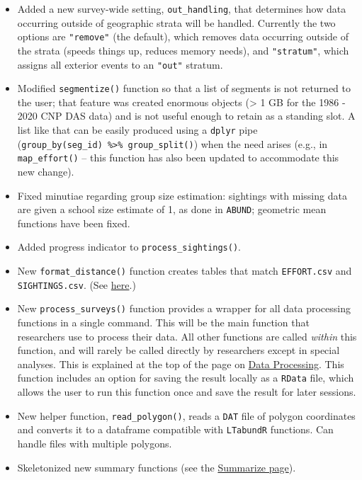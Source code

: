 \documentclass[
]{book}
\begin{document}
\begin{itemize}
\item
  Added a new survey-wide setting, \texttt{out\_handling}, that determines how data occurring outside of geographic strata will be handled. Currently the two options are \texttt{"remove"} (the default), which removes data occurring outside of the strata (speeds things up, reduces memory needs), and \texttt{"stratum"}, which assigns all exterior events to an \texttt{"out"} stratum.
\item
  Modified \texttt{segmentize()} function so that a list of segments is not returned to the user; that feature was created enormous objects (\textgreater{} 1 GB for the 1986 - 2020 CNP DAS data) and is not useful enough to retain as a standing slot. A list like that can be easily produced using a \texttt{dplyr} pipe (\texttt{group\_by(seg\_id)\ \%\textgreater{}\%\ group\_split()}) when the need arises (e.g., in \texttt{map\_effort()} -- this function has also been updated to accommodate this new change).
\item
  Fixed minutiae regarding group size estimation: sightings with missing data are given a school size estimate of 1, as done in \texttt{ABUND}; geometric mean functions have been fixed.
\item
  Added progress indicator to \texttt{process\_sightings()}.
\item
  New \texttt{format\_distance()} function creates tables that match \texttt{EFFORT.csv} and \texttt{SIGHTINGS.csv}. (See \protect\hyperlink{df}{here}.)
\item
  New \texttt{process\_surveys()} function provides a wrapper for all data processing functions in a single command. This will be the main function that researchers use to process their data. All other functions are called \emph{within} this function, and will rarely be called directly by researchers except in special analyses. This is explained at the top of the page on \protect\hyperlink{processing}{Data Processing}. This function includes an option for saving the result locally as a \texttt{RData} file, which allows the user to run this function once and save the result for later sessions.
\item
  New helper function, \texttt{read\_polygon()}, reads a \texttt{DAT} file of polygon coordinates and converts it to a dataframe compatible with \texttt{LTabundR} functions. Can handle files with multiple polygons.
\item
  Skeletonized new summary functions (see the \protect\hyperlink{summarize}{Summarize page}).

\end{itemize}
\end{document}
